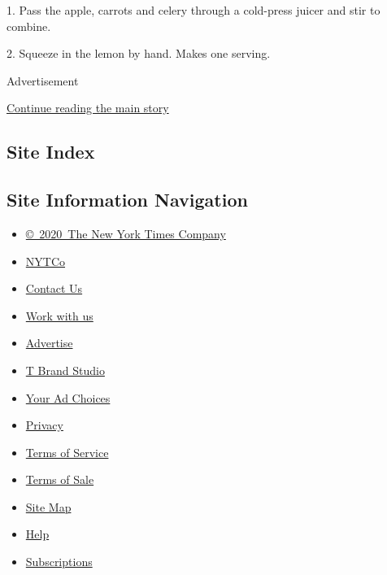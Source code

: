 1. Pass the apple, carrots and celery through a cold-press juicer and
stir to combine.

2. Squeeze in the lemon by hand. Makes one serving.

Advertisement

\protect\hyperlink{after-bottom}{Continue reading the main story}

\hypertarget{site-index}{%
\subsection{Site Index}\label{site-index}}

\hypertarget{site-information-navigation}{%
\subsection{Site Information
Navigation}\label{site-information-navigation}}

\begin{itemize}
\tightlist
\item
  \href{https://help.nytimes.com/hc/en-us/articles/115014792127-Copyright-notice}{©~2020~The
  New York Times Company}
\end{itemize}

\begin{itemize}
\tightlist
\item
  \href{https://www.nytco.com/}{NYTCo}
\item
  \href{https://help.nytimes.com/hc/en-us/articles/115015385887-Contact-Us}{Contact
  Us}
\item
  \href{https://www.nytco.com/careers/}{Work with us}
\item
  \href{https://nytmediakit.com/}{Advertise}
\item
  \href{http://www.tbrandstudio.com/}{T Brand Studio}
\item
  \href{https://www.nytimes.com/privacy/cookie-policy\#how-do-i-manage-trackers}{Your
  Ad Choices}
\item
  \href{https://www.nytimes.com/privacy}{Privacy}
\item
  \href{https://help.nytimes.com/hc/en-us/articles/115014893428-Terms-of-service}{Terms
  of Service}
\item
  \href{https://help.nytimes.com/hc/en-us/articles/115014893968-Terms-of-sale}{Terms
  of Sale}
\item
  \href{https://spiderbites.nytimes.com}{Site Map}
\item
  \href{https://help.nytimes.com/hc/en-us}{Help}
\item
  \href{https://www.nytimes.com/subscription?campaignId=37WXW}{Subscriptions}
\end{itemize}
